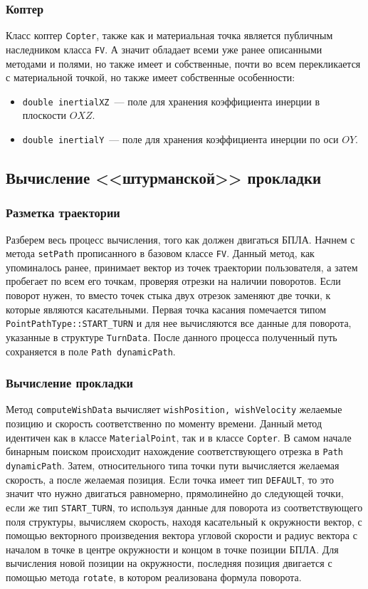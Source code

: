 \documentclass[a4paper,12pt]{article}
\numberwithin{figure}{subsubsection}
\begin{document}
\subsubsection{Коптер}
Класс коптер \texttt{Copter}, также как и материальная точка является публичным наследником класса \texttt{FV}. А значит обладает всеми уже ранее описанными методами и полями, но также имеет и собственные, почти во всем перекликается с материальной точкой, но также имеет собственные особенности:
\begin{itemize}
    \item \texttt{double inertialXZ}~--- поле для хранения коэффициента инерции в плоскости $OXZ$. 
    \item \texttt{double inertialY}~--- поле для хранения коэффициента инерции по оси $OY$.
\end{itemize}
\subsection{Вычисление <<штурманской>> прокладки}

\subsubsection{Разметка траектории}
Разберем весь процесс вычисления, того как должен двигаться БПЛА. 
Начнем с метода \texttt{setPath} прописанного в базовом классе \texttt{FV}.
Данный метод, как упоминалось ранее, принимает вектор из точек траектории пользователя, а затем пробегает по всем его точкам, проверяя отрезки на наличии поворотов.
Если поворот нужен, то вместо точек стыка двух отрезок заменяют две точки, к которые являются касательными. Первая точка касания помечается типом \texttt{PointPathType::START\_TURN} и для нее вычисляются все данные для поворота, указанные в структуре \texttt{TurnData}. После данного процесса полученный путь сохраняется в поле \texttt{Path dynamicPath}.

\subsubsection{Вычисление прокладки}
Метод \texttt{computeWishData} вычисляет \texttt{wishPosition, wishVelocity} желаемые позицию и скорость соответственно по моменту времени. Данный метод идентичен как в классе \texttt{MaterialPoint}, так и в классе \texttt{Copter}. В самом начале бинарным поиском происходит нахождение соответствующего отрезка в \texttt{Path dynamicPath}. Затем, относительного типа точки пути вычисляется желаемая скорость, а после желаемая позиция. Если точка имеет тип \texttt{DEFAULT}, то это значит что нужно двигаться равномерно, прямолинейно до следующей точки, если же тип \texttt{START\_TURN}, то используя данные для поворота из соответствующего поля структуры, вычисляем скорость, находя касательный к окружности вектор, с помощью векторного произведения вектора угловой скорости и радиус вектора с началом в точке в центре окружности и концом в точке позиции БПЛА. Для вычисления новой позиции на окружности, последняя позиция двигается с помощью метода \texttt{rotate}, в котором реализована формула поворота.
\end{document}
